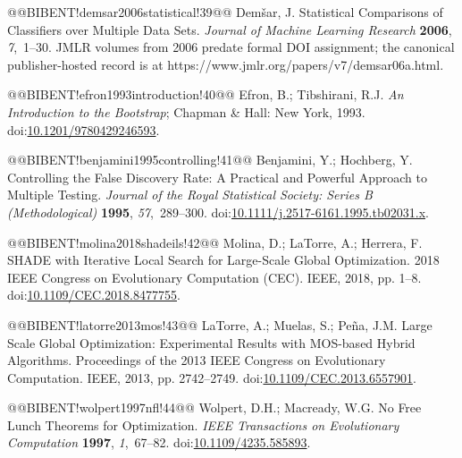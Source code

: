 \documentclass[10pt,a4paper]{article}
\begin{document}
@@BIBENT!demsar2006statistical!39@@ Dem\v{s}ar, J. Statistical Comparisons of Classifiers over Multiple Data Sets. \emph{Journal of Machine Learning Research} \textbf{2006}, \emph{7},~1--30. JMLR volumes from 2006 predate formal DOI assignment; the canonical publisher-hosted record is at https://www.jmlr.org/papers/v7/demsar06a.html.

@@BIBENT!efron1993introduction!40@@ Efron, B.; Tibshirani, R.J. \emph{An Introduction to the Bootstrap}; Chapman \& Hall: New York, 1993. doi:{\href{https://doi.org/10.1201/9780429246593}{10.1201/9780429246593}}.

@@BIBENT!benjamini1995controlling!41@@ Benjamini, Y.; Hochberg, Y. Controlling the False Discovery Rate: A Practical and Powerful Approach to Multiple Testing. \emph{Journal of the Royal Statistical Society: Series B (Methodological)} \textbf{1995}, \emph{57},~289--300. doi:{\href{https://doi.org/10.1111/j.2517-6161.1995.tb02031.x}{10.1111/j.2517-6161.1995.tb02031.x}}.

@@BIBENT!molina2018shadeils!42@@ Molina, D.; LaTorre, A.; Herrera, F. {SHADE} with Iterative Local Search for Large-Scale Global Optimization. 2018 IEEE Congress on Evolutionary Computation (CEC). IEEE, 2018, pp. 1--8. doi:{\href{https://doi.org/10.1109/CEC.2018.8477755}{10.1109/CEC.2018.8477755}}.

@@BIBENT!latorre2013mos!43@@ LaTorre, A.; Muelas, S.; Pe{\~n}a, J.M. Large Scale Global Optimization: Experimental Results with {MOS}-based Hybrid Algorithms. Proceedings of the 2013 IEEE Congress on Evolutionary Computation. IEEE, 2013, pp. 2742--2749. doi:{\href{https://doi.org/10.1109/CEC.2013.6557901}{10.1109/CEC.2013.6557901}}.

@@BIBENT!wolpert1997nfl!44@@ Wolpert, D.H.; Macready, W.G. No Free Lunch Theorems for Optimization. \emph{IEEE Transactions on Evolutionary Computation} \textbf{1997}, \emph{1},~67--82. doi:{\href{https://doi.org/10.1109/4235.585893}{10.1109/4235.585893}}.
\end{document}

